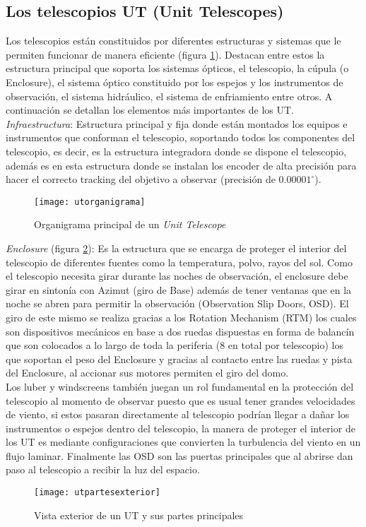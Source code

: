 	    \subsection{Los telescopios UT (Unit Telescopes)}	    
	    	Los telescopios están constituidos por diferentes estructuras y sistemas que le permiten funcionar de manera eficiente (figura \ref{fig:UTorganigrama}). Destacan entre estos la estructura principal que soporta los sistemas ópticos, el telescopio, la cúpula (o Enclosure), el sistema óptico constituido por los espejos y los instrumentos de observación, el sistema hidráulico, el sistema de enfriamiento entre otros. A continuación se detallan los elementos más importantes de los UT.\\
	    	\textit{Infraestructura}: Estructura principal y fija donde están montados los equipos e instrumentos que conforman el telescopio, soportando todos los componentes del telescopio, es decir, es la estructura integradora donde se dispone el telescopio, además es en esta estructura donde se instalan los encoder de alta precisión para hacer el correcto tracking del objetivo a observar (precisión de ${0.00001^\circ}$).\\
	    	\begin{figure}[H]
	    		\centering
	    		\texttt{[image: utorganigrama]}
	    		\caption{Organigrama principal de un \textit{Unit Telescope}}
	    		\label{fig:UTorganigrama}
	    	\end{figure}    	
	    	\textit{Enclosure} (figura \ref{fig:UTexteriorpartes}): Es la estructura que se encarga de proteger el interior del telescopio de diferentes fuentes como la temperatura, polvo, rayos del sol. Como el telescopio necesita girar durante las noches de observación, el enclosure debe girar en sintonía con Azimut (giro de Base) además de tener ventanas que en la noche se abren para permitir la observación (Observation Slip Doors, OSD). El giro de este mismo se realiza gracias a los Rotation Mechanism (RTM) los cuales son dispositivos mecánicos en base a dos ruedas dispuestas en forma de balancín que son colocados a lo largo de toda la periferia (8 en total por telescopio) los que soportan el peso del Enclosure y gracias al contacto entre las ruedas y pista del Enclosure, al accionar sus motores permiten el giro del domo. \\
	    	Los luber y windscreens también juegan un rol fundamental en la protección del telescopio al momento de observar puesto que es usual tener grandes velocidades de viento, si estos pasaran directamente al telescopio podrían llegar a dañar los instrumentos o espejos dentro del telescopio, la manera de proteger el interior de los UT es mediante configuraciones que convierten la turbulencia del viento en un flujo laminar. Finalmente las OSD son las puertas principales que al abrirse dan paso al telescopio a recibir la luz del espacio.\\
	    	\begin{figure}[H]
	    		\centering
	    		\texttt{[image: utpartesexterior]}
	    		\caption{Vista exterior de un UT y sus partes principales}
	    		\label{fig:UTexteriorpartes}
	    	\end{figure}
	    	
